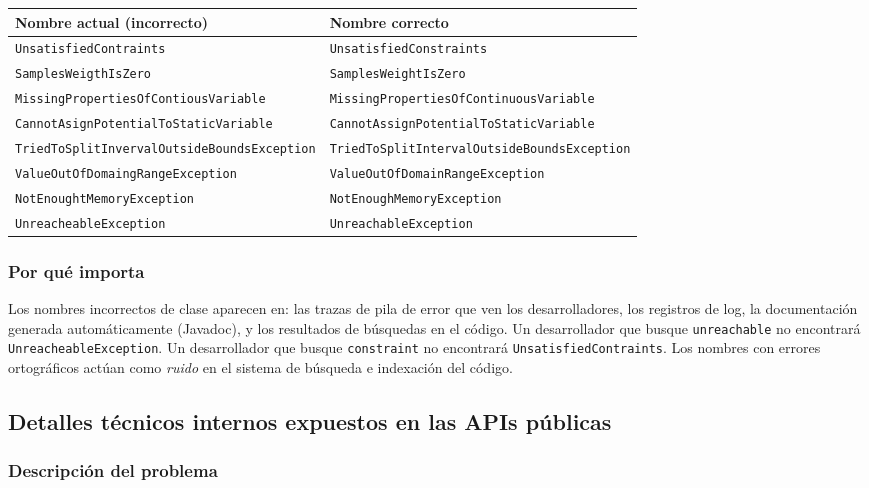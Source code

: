 \documentclass[11pt,a4paper]{article}
\begin{document}
{\small
\begin{longtable}{p{8cm}p{7cm}}
    \toprule
    \textbf{Nombre actual (incorrecto)} & \textbf{Nombre correcto} \\
    \midrule
    \texttt{UnsatisfiedContraints}                & \texttt{UnsatisfiedConstraints} \\
    \texttt{SamplesWeigthIsZero}                  & \texttt{SamplesWeightIsZero} \\
    \texttt{MissingPropertiesOfContiousVariable}  & \texttt{MissingProperties\-OfContinuousVariable} \\
    \texttt{CannotAsignPotentialToStaticVariable} & \texttt{CannotAssignPotential\-ToStaticVariable} \\
    \texttt{TriedToSplitInverval\-OutsideBoundsException} & \texttt{TriedToSplitInterval\-OutsideBoundsException} \\
    \texttt{ValueOutOfDomaingRangeException}      & \texttt{ValueOutOfDomainRangeException} \\
    \texttt{NotEnoughtMemoryException}            & \texttt{NotEnoughMemoryException} \\
    \texttt{UnreacheableException}                & \texttt{UnreachableException} \\
    \bottomrule
\end{longtable}
}

\subsubsection{Por qué importa}

Los nombres incorrectos de clase aparecen en: las trazas de pila de error que ven los
desarrolladores, los registros de log, la documentación generada automáticamente (Javadoc), y
los resultados de búsquedas en el código. Un desarrollador que busque \texttt{unreachable} no
encontrará \texttt{UnreacheableException}. Un desarrollador que busque \texttt{constraint} no
encontrará \texttt{UnsatisfiedContraints}. Los nombres con errores ortográficos actúan como
\emph{ruido} en el sistema de búsqueda e indexación del código.

\subsection{Detalles técnicos internos expuestos en las APIs públicas}

\subsubsection{Descripción del problema}
\end{document}
